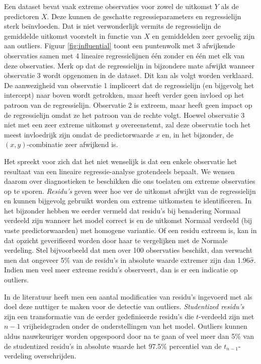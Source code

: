 \documentclass[
  12pt,dutch,coursenotes]{book}
\theoremstyle{definition}
\theoremstyle{definition}
\theoremstyle{definition}
\theoremstyle{definition}
\theoremstyle{remark}
\begin{document}
Een dataset bevat vaak extreme observaties voor zowel de uitkomst \(Y\) als de predictoren \(X\). Deze kunnen de geschatte regressieparameters en regressielijn sterk beïnvloeden. Dat is niet verwonderlijk vermits de regressielijn de gemiddelde uitkomst voorstelt in functie van \(X\) en gemiddelden zeer gevoelig zijn aan outliers. Figuur \ref{fig:influential} toont een puntenwolk met 3 afwijkende observaties samen met 4 lineaire regressielijnen één zonder en één met elk van deze observaties. Merk op dat de regressielijn in bijzondere mate afwijkt wanneer observatie 3 wordt opgenomen in de dataset. Dit kan als volgt worden verklaard. De aanwezigheid van observatie 1 impliceert dat de regressielijn (en bijgevolg het intercept) naar boven wordt getrokken, maar heeft verder geen invloed op het patroon van de regressielijn. Observatie 2 is extreem, maar heeft geen impact op de regressielijn omdat ze het patroon van de rechte volgt. Hoewel observatie 3 niet met een zeer extreme uitkomst \(y\) overeenstemt, zal deze observatie toch het meest invloedrijk zijn omdat de predictorwaarde \(x\) en, in het bijzonder, de \((x,y)\)-combinatie zeer afwijkend is.

Het spreekt voor zich dat het niet wenselijk is dat een enkele observatie het resultaat van een lineaire regressie-analyse grotendeels bepaalt. We wensen daarom over diagnostieken te beschikken die ons toelaten om extreme observaties op te sporen. \emph{Residu's} geven weer hoe ver de uitkomst afwijkt van de regressielijn en kunnen bijgevolg gebruikt worden om extreme uitkomsten te identificeren. In het bijzonder hebben we eerder vermeld dat residu's bij benadering Normaal verdeeld zijn wanneer het model correct is en de uitkomst Normaal verdeeld (bij vaste predictorwaarden) met homogene variantie. Of een residu extreem is, kan in dat opzicht geverifieerd worden door haar te vergelijken met de Normale verdeling. Stel bijvoorbeeld dat men over 100 observaties beschikt, dan verwacht men dat ongeveer 5\% van de residu's in absolute waarde extremer zijn dan 1.96\(\hat{\sigma}\). Indien men veel meer extreme residu's observeert, dan is er een indicatie op outliers.

In de literatuur heeft men een aantal modificaties van residu's ingevoerd met als doel deze nuttiger te maken voor de detectie van outliers. \emph{Studentized residu's} zijn een transformatie van de eerder gedefinieerde residu's die \(t\)-verdeeld zijn met \(n-1\) vrijheidsgraden onder de onderstellingen van het model. Outliers kunnen aldus nauwkeuriger worden opgespoord door na te gaan of veel meer dan 5\% van de studentized residu's in absolute waarde het 97.5\% percentiel van de \(t_{n-1}\)-verdeling overschrijden.
\end{document}
